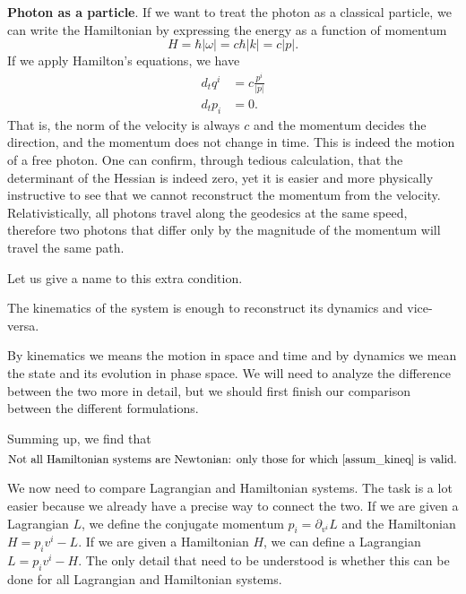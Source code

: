 \textbf{Photon as a particle}. If we want to treat the photon as a classical particle, we can write the Hamiltonian by expressing the energy as a function of momentum
\begin{equation}
	H=\hbar | \omega| = c \hbar |k| = c |p|.
\end{equation}
If we apply Hamilton's equations, we have
\begin{equation}
	\begin{aligned}
		d_t q^i &= c \frac{p^i}{|p|} \\
		d_t p_i &= 0.
	\end{aligned}
\end{equation}
That is, the norm of the velocity is always $c$ and the momentum decides the direction, and the momentum does not change in time. This is indeed the motion of a free photon. One can confirm, through tedious calculation, that the determinant of the Hessian is indeed zero, yet it is easier and more physically instructive to see that we cannot reconstruct the momentum from the velocity. Relativistically, all photons travel along the geodesics at the same speed, therefore two photons that differ only by the magnitude of the momentum will travel the same path.

Let us give a name to this extra condition.
\renewcommand{\theassump}{KE}%
\begin{assump}\label{assum_kineq}
	The kinematics of the system is enough to reconstruct its dynamics and vice-versa.
\end{assump}
\renewcommand{\theassump}{\Roman{assump}}%
By kinematics we means the motion in space and time and by dynamics we mean the state and its evolution in phase space. We will need to analyze the difference between the two more in detail, but we should first finish our comparison between the different formulations.

Summing up, we find that
\begin{equation}
	\textrm{Not all Hamiltonian systems are Newtonian: only those for which  \ref{assum_kineq} is valid.}
\end{equation}


We now need to compare Lagrangian and Hamiltonian systems. The task is a lot easier because we already have a precise way to connect the two. If we are given a Lagrangian $L$, we define the conjugate momentum $p_i = \partial_{v^i} L$ and the Hamiltonian $H = p_i v^i - L$. If we are given a Hamiltonian $H$, we can define a Lagrangian $L = p_i v^i - H$. The only detail that need to be understood is whether this can be done for all Lagrangian and Hamiltonian systems.

